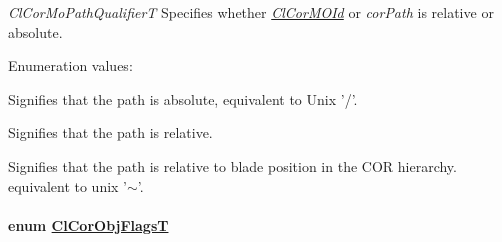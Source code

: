 {\em Cl\-Cor\-Mo\-Path\-Qualifier\-T\/} Specifies whether {\em \hyperlink{struct_cl_cor_m_o_id}{Cl\-Cor\-MOId}\/} or {\em cor\-Path\/} is relative or absolute. \begin{Desc}
\item[Enumeration values: ]\par
\begin{description}
\item[{\em 
\hypertarget{group__group13_gga337a165}{
CL\_\-COR\_\-MO\_\-PATH\_\-ABSOLUTE}
\label{group__group13_gga337a165}
}]Signifies that the path is absolute, equivalent to Unix '/'. \item[{\em 
\hypertarget{group__group13_gga337a166}{
CL\_\-COR\_\-MO\_\-PATH\_\-RELATIVE}
\label{group__group13_gga337a166}
}]Signifies that the path is relative. \item[{\em 
\hypertarget{group__group13_gga337a167}{
CL\_\-COR\_\-MO\_\-PATH\_\-RELATIVE\_\-TO\_\-BASE}
\label{group__group13_gga337a167}
}]Signifies that the path is relative to blade position in the COR hierarchy. equivalent to unix '$\sim$'. \item[{\em 
\hypertarget{group__group13_gga337a168}{
CL\_\-COR\_\-MO\_\-PATH\_\-QUALIFIER\_\-MAX}
\label{group__group13_gga337a168}
}]\end{description}
\end{Desc}

\hypertarget{group__group13_ga335}{
\paragraph[ClCorObjFlagsT]{\setlength{\rightskip}{0pt plus 5cm}enum \hyperlink{group__group13_ga335}{Cl\-Cor\-Obj\-Flags\-T}}\hfill}
\label{group__group13_ga335}


